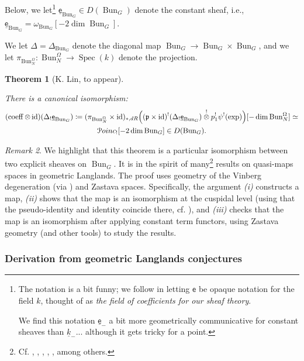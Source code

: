 \documentclass[reqno,11pt]{amsart}
\numberwithin{equation}{subsection}
\newtheorem{thm}{Theorem}[subsubsection]
\theoremstyle{remark}
\newtheorem{rem}[thm]{Remark}
\newcommand{\sP}{{\EuScript P}}
\newcommand{\fp}{{\mathfrak p}}
\newcommand{\on}{\operatorname}
\newcommand{\ul}{\underline}
\newcommand{\Spec}{\on{Spec}}
\newcommand{\id}{\on{id}}
\newcommand{\Bun}{\on{Bun}}
\newcommand{\coeff}{\on{coeff}}
\newcommand{\Poinc}{\sP oinc}
\newcommand{\sfe}{\mathsf{e}}
\begin{document}
Below, we let\footnote{The notation is a bit funny; we follow \cite{agkrrv1} in 
letting $\sfe$ be opaque notation for the field $k$, thought of as 
\emph{the field of coefficients for our sheaf theory}. 

We find this notation $\ul{\sfe}_{-}$ a bit more geometrically communicative for constant sheaves
than $\ul{k}_{-}$... although it gets tricky for a point.} 
$\ul{\sfe}_{\Bun_G} \in D(\Bun_G)$ denote the constant sheaf, 
i.e., $\ul{\sfe}_{\Bun_G} = \omega_{\Bun_G}[-2\dim \Bun_G]$.

We let $\Delta = \Delta_{\Bun_G}$ denote the diagonal map 
$\Bun_G \to \Bun_G \times \Bun_G$, and we let 
$\pi_{\Bun_N^{\Omega}}:\Bun_N^{\Omega} \to \Spec(k)$ denote the projection.

\begin{thm}[K. Lin, to appear]\label{t:lin}

There is a canonical isomorphism:
%
\[
\begin{gathered}
(\coeff \otimes \id)(\Delta_!\ul{\sfe}_{\Bun_G}) 
\coloneqq 
(\pi_{\Bun_N^{\Omega}} \times \id)_{*,dR}
\Big((\fp \times \id)^!(\Delta_!\ul{\sfe}_{\Bun_G})\overset{!}{\otimes} 
p_1^!\psi^!(\exp)\Big)[-\dim \Bun_N^{\Omega}]
\simeq \\
 \Poinc_![-2\dim \Bun_G] \in D(\Bun_G).
 \end{gathered}
\]

\end{thm}

\begin{rem}

We highlight that this theorem is a particular isomorphism between
two explicit sheaves on $\Bun_G$. It is in the spirit of
many\footnote{Cf. 
\cite{geometric-eisenstein}, \cite{ic-drinfeld}, \cite{lin-dl},
\cite{schieder}, \cite{sakellaridis-wang}, among others.} 
results on quasi-maps spaces in geometric Langlands.
The proof uses geometry of the Vinberg degeneration (via \cite{lin-dl}) 
and Zastava spaces. Specifically, the argument \emph{(i)} constructs a map,
\emph{(ii)} shows that the map is an isomorphism at the cuspidal level
(using that the pseudo-identity and identity coincide there, cf. 
\cite{strange}), and \emph{(iii)} checks that the map is an isomorphism after 
applying constant term functors, using Zastava geometry (and other tools) 
to study the results. 

\end{rem}

\subsubsection{Derivation from geometric Langlands conjectures}
\end{document}
